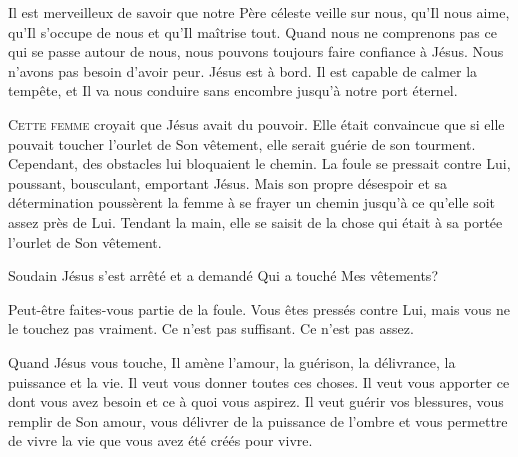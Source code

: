 Il est merveilleux de savoir que notre Père céleste veille sur nous,
 qu'Il nous aime, qu'Il s'occupe de nous et qu'Il maîtrise tout.
 Quand nous ne comprenons pas ce qui se passe autour de nous,
 nous pouvons toujours faire confiance à Jésus.
 Nous n'avons pas besoin d'avoir peur. Jésus est à bord.
 Il  est capable de calmer la tempête,
 et Il va nous conduire sans encombre jusqu'à notre port éternel.

\dvrule






\lettrine{C}{ette femme} croyait que Jésus avait du pouvoir.
 Elle était convaincue que si elle pouvait toucher l'ourlet de Son vêtement,
 elle serait guérie de son tourment. Cependant, des obstacles
 lui bloquaient le chemin. La foule se pressait contre Lui,
 poussant, bousculant, emportant Jésus.
 Mais son propre désespoir et sa détermination poussèrent la femme
 à se frayer un chemin jusqu'à ce qu'elle soit assez près de Lui.
 Tendant la main, elle se saisit de la chose qui était à sa portée
 \ocadr l'ourlet de Son vêtement.

Soudain Jésus s'est arrêté et a demandé\frcolon{} 
 \Og Qui a touché Mes vêtements? \Fg{}


Peut-être faites-vous partie de la foule. Vous êtes pressés contre Lui,
 mais vous ne le touchez pas vraiment. Ce n'est pas suffisant.
 Ce n'est pas assez.

Quand Jésus vous touche, Il amène l'amour, la guérison, la délivrance,
 la puissance et la vie. Il veut vous donner toutes ces choses.
 Il veut vous  apporter ce dont vous avez besoin
 et ce à quoi vous aspirez. Il veut guérir vos blessures,
 vous remplir de Son amour, vous délivrer de la puissance de l'ombre
 et vous permettre de vivre la vie que vous avez été créés pour vivre.

